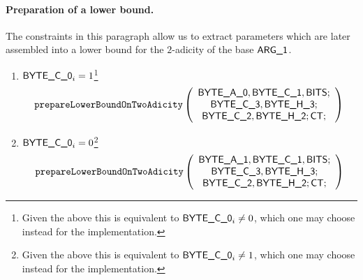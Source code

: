 \paragraph{Preparation of a lower bound.}
The constraints in this paragraph allow us to extract parameters which are later assembled into a lower bound for the $2$-adicity of the base $\textsf{ARG}\textsf{\_1}$.
\begin{enumerate}[resume]
	\item
	\If $\textsf{BYTE}\textsf{\_C\_0}_{i} = 1$\footnote{Given the above this is equivalent to $\textsf{BYTE}\textsf{\_C\_0}_{i} \neq 0$, which one may choose instead for the implementation.} \Then
	\[
			\texttt{prepareLowerBoundOnTwoAdicity}
			\left(
			\begin{array}{c}
			\textsf{BYTE}\textsf{\_A\_0},
			\textsf{BYTE}\textsf{\_C\_1},
			\textsf{BITS}; \\
			\textsf{BYTE}\textsf{\_C\_3},
			\textsf{BYTE}\textsf{\_H\_3}; \\
			\textsf{BYTE}\textsf{\_C\_2},
			\textsf{BYTE}\textsf{\_H\_2};
			\textsf{CT}{};
			\end{array}
			\right) \\
	\]
	\item \If $\textsf{BYTE}\textsf{\_C\_0}_{i} = 0$\footnote{Given the above this is equivalent to $\textsf{BYTE}\textsf{\_C\_0}_{i} \neq 1$, which one may choose instead for the implementation.} \Then
	\[
			\texttt{prepareLowerBoundOnTwoAdicity}
			\left(
			\begin{array}{c}
			\textsf{BYTE}\textsf{\_A\_1},
			\textsf{BYTE}\textsf{\_C\_1},
			\textsf{BITS}; \\
			\textsf{BYTE}\textsf{\_C\_3},
			\textsf{BYTE}\textsf{\_H\_3}; \\
			\textsf{BYTE}\textsf{\_C\_2},
			\textsf{BYTE}\textsf{\_H\_2};
			\textsf{CT}{};
			\end{array}
			\right)
	\]
\end{enumerate}

